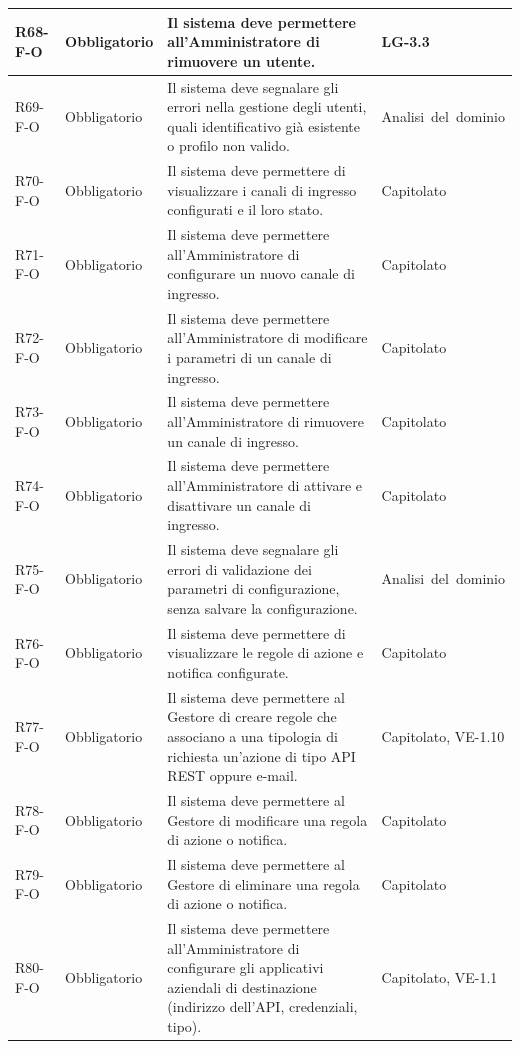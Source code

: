 {\begin{longtable}{|>{\raggedright\arraybackslash}p{1.8cm}|>{\raggedright\arraybackslash}p{2.3cm}|>{\raggedright\arraybackslash}p{6.6cm}|>{\raggedright\arraybackslash}p{3.1cm}|}
    \mbox{R68-F-O} & Obbligatorio & Il sistema deve permettere all'Amministratore di rimuovere un utente. & \mbox{LG-3.3} \\ \hline
    \mbox{R69-F-O} & Obbligatorio & Il sistema deve segnalare gli errori nella gestione degli utenti, quali identificativo già esistente o profilo non valido. & \mbox{Analisi del dominio} \\ \hline
    \mbox{R70-F-O} & Obbligatorio & Il sistema deve permettere di visualizzare i canali di ingresso configurati e il loro stato. & \mbox{Capitolato} \\ \hline
    \mbox{R71-F-O} & Obbligatorio & Il sistema deve permettere all'Amministratore di configurare un nuovo canale di ingresso. & \mbox{Capitolato} \\ \hline
    \mbox{R72-F-O} & Obbligatorio & Il sistema deve permettere all'Amministratore di modificare i parametri di un canale di ingresso. & \mbox{Capitolato} \\ \hline
    \mbox{R73-F-O} & Obbligatorio & Il sistema deve permettere all'Amministratore di rimuovere un canale di ingresso. & \mbox{Capitolato} \\ \hline
    \mbox{R74-F-O} & Obbligatorio & Il sistema deve permettere all'Amministratore di attivare e disattivare un canale di ingresso. & \mbox{Capitolato} \\ \hline
    \mbox{R75-F-O} & Obbligatorio & Il sistema deve segnalare gli errori di validazione dei parametri di configurazione, senza salvare la configurazione. & \mbox{Analisi del dominio} \\ \hline
    \mbox{R76-F-O} & Obbligatorio & Il sistema deve permettere di visualizzare le regole di azione e notifica configurate. & \mbox{Capitolato} \\ \hline
    \mbox{R77-F-O} & Obbligatorio & Il sistema deve permettere al Gestore di creare regole che associano a una tipologia di richiesta un'azione di tipo API REST oppure e-mail. & \mbox{Capitolato}, \mbox{VE-1.10} \\ \hline
    \mbox{R78-F-O} & Obbligatorio & Il sistema deve permettere al Gestore di modificare una regola di azione o notifica. & \mbox{Capitolato} \\ \hline
    \mbox{R79-F-O} & Obbligatorio & Il sistema deve permettere al Gestore di eliminare una regola di azione o notifica. & \mbox{Capitolato} \\ \hline
    \mbox{R80-F-O} & Obbligatorio & Il sistema deve permettere all'Amministratore di configurare gli applicativi aziendali di destinazione (indirizzo dell'API, credenziali, tipo). & \mbox{Capitolato}, \mbox{VE-1.1} \\ \hline

\end{longtable}}
